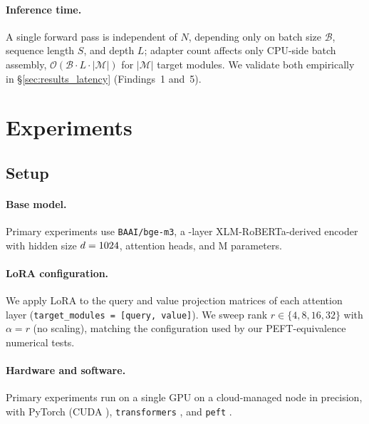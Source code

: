 \documentclass[11pt]{article}
\begin{document}
\paragraph{Inference time.}
A single forward pass is independent of $N$, depending only on batch size
$\mathcal{B}$, sequence length $S$, and depth $L$; adapter count affects only
CPU-side batch assembly, $\mathcal{O}(\mathcal{B} \cdot L \cdot |\mathcal{M}|)$
for $|\mathcal{M}|$ target modules. We validate both empirically in
\S\ref{sec:results_latency} (Findings~1 and~5).

\section{Experiments}
\label{sec:experiments}

\subsection{Setup}
\label{sec:setup}

\paragraph{Base model.}
Primary experiments use \texttt{BAAI/bge-m3},
a \BgeLayers-layer XLM-RoBERTa-derived encoder with hidden size $d=1024$,
\BgeHeads{} attention heads, and \BgeParamsM{}M parameters.

\paragraph{LoRA configuration.}
We apply LoRA to the query and value projection matrices of each attention
layer (\texttt{target\_modules = [query, value]}).
We sweep rank $r \in \{4, 8, 16, 32\}$ with $\alpha = r$ (no scaling), matching
the configuration used by our PEFT-equivalence numerical tests.

\paragraph{Hardware and software.}
Primary experiments run on a single \HeadlineGPU{} GPU on a
cloud-managed node in \HeadlineDtype{} precision, with PyTorch
\EnvTorchVersion{} (CUDA \EnvCudaVersion{}), \texttt{transformers}
\EnvTransformersVersion{}, and \texttt{peft} \EnvPeftVersion{}.
\end{document}
